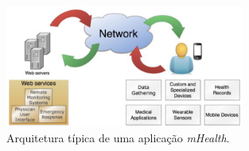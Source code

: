 \begin{figure}[H]
  \centering
  \includegraphics[width=0.7\textwidth]{imgs/mHealthArch.png}
  \caption[Arquitetura t\'ipica de uma  aplica\c c\~ao \textit{mHealth}]{Arquitetura t\'ipica de uma  aplica\c c\~ao \textit{mHealth}. \cite{mhealth}}
  
  \label{f:mhealtharch}
\end{figure}



